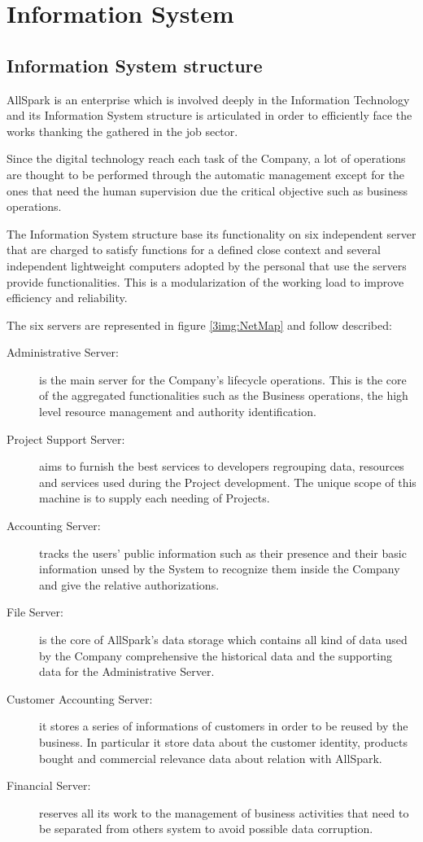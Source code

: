 \chapter{Information System}
 
\section{Information System structure}
AllSpark is an enterprise which is involved deeply in the Information Technology and its Information System structure is articulated in order to efficiently face the works thanking the gathered in the job sector.

Since the digital technology reach each task of the Company, a lot of operations are thought to be performed through the automatic management except for the ones that need the human supervision due the critical objective such as business operations. 

The Information System structure base its functionality on six independent server that are charged to satisfy functions for a defined close context and several independent lightweight computers adopted by the personal that use the servers provide functionalities. This is a modularization of the working load to improve efficiency and reliability.

The six servers are represented in figure \ref{3img:NetMap} and follow described:
\begin{description}
\item[Administrative Server:] is the main server for the Company's lifecycle operations. This is the core of the aggregated functionalities such as the Business operations, the high level resource management and authority identification.
\item[Project Support Server:] aims to furnish the best services to developers regrouping data, resources and services used during the Project development. The unique scope of this machine is to supply each needing of Projects.
\item[Accounting Server:] tracks the users' public information such as their presence and their basic information unsed by the System to recognize them inside the Company and give the relative authorizations.
\item[File Server:] is the core of AllSpark's data storage which contains all kind of data used by the Company comprehensive the historical data and the supporting data for the Administrative Server. 
\item[Customer Accounting Server:] it stores a series of informations of customers in order to be reused by the business. In particular it store data about the customer identity, products bought and commercial relevance data about relation with AllSpark.
\item[Financial Server:] reserves all its work to the management of business activities that need to be separated from others system to avoid possible data corruption.
\end{description}

